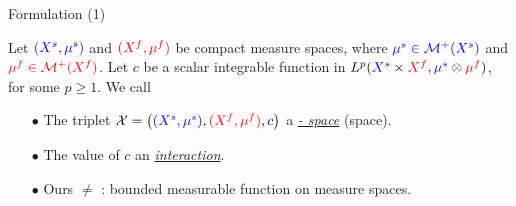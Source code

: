 \documentclass{beamer}
\newcommand{\cX}{\mathcal X}
\newcommand{\cM}{\mathcal M}
\newcommand{\sfspace}{{\color{blue}{s.}}{\color{red}{f. }}}
\begin{document}
\begin{frame}{Formulation (1)}
\scriptsize
  \begin{definition}
    Let ${\color{blue}{(X^s, \mu^s)}}$ and ${\color{red}{(X^f, \mu^f)}}$
    be compact measure spaces, where ${\color{blue}{\mu^s \in \cM^+(X^s)}}$
    and ${\color{red}{\mu^f \in \cM^+(X^f)}}$.
    Let $c$ be a scalar integrable function in
    $L^p({\color{blue}{X^s}} \times {\color{red}{X^f}}, {\color{blue}{\mu^s}} \otimes {\color{red}{\mu^f}})$,
    for some $p \geq 1$. We call
    \begin{itemize}
      \setlength\itemindent{10pt}
      \item[$\bullet$] The triplet
      $\cX = \left({\color{blue}{(X^s, \mu^s)}}, {\color{red}{(X^f, \mu^f)}}, c \right)$
      a \underline{\textit{{\color{blue}{sample}} - {\color{red}{feature}} space}}
      (\sfspace space).

      \item[$\bullet$] The value of $c$ an \textit{\underline{interaction}}.
    \end{itemize}
  \end{definition}
  \begin{itemize}
    \setlength\itemindent{5pt}
    \item[$\bullet$] Ours $\neq$ \parencite{Chowdhury21b}: bounded measurable function on measure spaces.
  \end{itemize}


\end{frame}
\end{document}
